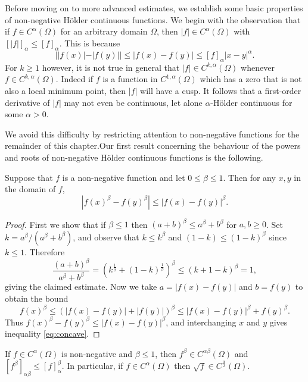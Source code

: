 \documentclass[oneside,hidelinks,indentfirst,10pt]{book}
\begin{document}
Before moving on to more advanced estimates, we establish some basic properties of non-negative H\"older continuous functions. We begin with the observation that if \(f\in C^\alpha(\Omega)\) for an arbitrary domain \(\Omega\), then \(|f|\in C^\alpha(\Omega)\) with \([|f|]_\alpha\leq [f]_\alpha\). This is because
\[
    ||f(x)|-|f(y)||\leq |f(x)-f(y)|\leq [f]_\alpha|x-y|^\alpha.
\]
For \(k\geq 1\) however, it is not true in general that \(|f|\in C^{k,\alpha}(\Omega)\) whenever \(f\in C^{k,\alpha}(\Omega)\). Indeed if \(f\) is a function in \(C^{1,\alpha}(\Omega)\) which has a zero that is not also a local minimum point, then \(|f|\) will have a cusp. It follows that a first-order derivative of \(|f|\) may not even be continuous, let alone \(\alpha\)-H\"older continuous for some \(\alpha>0\). 


We avoid this difficulty by restricting attention to non-negative functions for the remainder of this chapter.Our first result concerning the behaviour of the powers and roots of non-negative H\"older continuous functions is the following.


\begin{lem}\label{lem:smallpow}
Suppose that \(f\) is a non-negative function and let \(0\leq\beta\leq 1\). Then for any \(x,y\) in the domain of \(f\),
\begin{equation}\label{eq:concave}
    |f(x)^\beta-f(y)^\beta|\leq |f(x)-f(y)|^\beta.
\end{equation}
\end{lem}


\begin{proof}
First we show that if \(\beta\leq 1\) then \((a+b)^\beta\leq a^\beta+b^\beta\) for \(a,b\geq 0\). Set \(k=a^\beta/(a^\beta+b^\beta)\), and observe that \(k\leq k^\beta\) and \((1-k)\leq (1-k)^\beta\) since \(k\leq 1\). Therefore
\[
    \frac{(a+b)^\beta}{a^\beta+b^\beta}=(k^\frac{1}{\beta}+(1-k)^\frac{1}{\beta})^\beta\leq (k+1-k)^\beta=1,
\]
giving the claimed estimate. Now we take \(a=|f(x)-f(y)|\) and \(b=f(y)\) to obtain the bound
\[
    f(x)^\beta \leq (|f(x)-f(y)|+|f(y)|)^\beta\leq |f(x)-f(y)|^\beta+f(y)^\beta.
\]
Thus \(f(x)^\beta-f(y)^\beta\leq |f(x)-f(y)|^\beta\), and interchanging \(x\) and \(y\) gives inequality \eqref{eq:concave}.
\end{proof}


\begin{cor}\label{cor:easycase}
If \(f\in C^\alpha(\Omega)\) is non-negative and \(\beta\leq 1\), then \(f^\beta\in C^{\alpha\beta}(\Omega)\) and \([f^\beta]_{\alpha\beta}\leq [f]_\alpha^\beta\). In particular, if \(f\in C^\alpha(\Omega)\) then \(\sqrt{f}\in C^\frac{\alpha}{2}(\Omega)\).
\end{cor}
\end{document}
